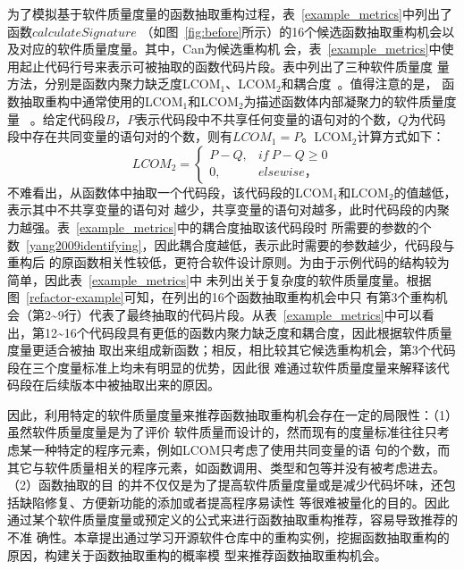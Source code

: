 为了模拟基于软件质量度量的函数抽取重构过程，表~\ref{example_metrics}中列出了函数$calculateSignature$
（如图~\ref{fig:before}所示）的16个候选函数抽取重构机会以及对应的软件质量度量。其中，Can为候选重构机
会，表~\ref{example_metrics}中使用起止代码行号来表示可被抽取的函数代码片段。表中列出了三种软件质量度
量方法，分别是函数内聚力缺乏度LCOM$_1$、LCOM$_2$和耦合度~\cite{yang2009identifying}。值得注意的是，
函数抽取重构中通常使用的LCOM$_1$和LCOM$_2$为描述函数体内部凝聚力的软件质量度量
~\cite{charalampidou2015size}。给定代码段$B$，$P$表示代码段中不共享任何变量的语句对的个数，$Q$为代码
段中存在共同变量的语句对的个数，则有$LCOM_1=P$。LCOM$_2$计算方式如下：
\begin{equation}\label{eq:lcom2}
      LCOM_2 = 
       \begin{cases}
             P-Q, & \textit{if}~P-Q\geq 0\\ 
  0, & elsewise，  
       \end{cases}
\end{equation}
不难看出，从函数体中抽取一个代码段，该代码段的LCOM$_1$和LCOM$_2$的值越低，表示其中不共享变量的语句对
越少，共享变量的语句对越多，此时代码段的内聚力越强。表~\ref{example_metrics}中的耦合度抽取该代码段时
所需要的参数的个数~\ref{yang2009identifying}，因此耦合度越低，表示此时需要的参数越少，代码段与重构后
的原函数相关性较低，更符合软件设计原则。为由于示例代码的结构较为简单，因此表~\ref{example_metrics}中
未列出关于复杂度的软件质量度量。根据图~\ref{refactor-example}可知，在列出的16个函数抽取重构机会中只
有第3个重构机会（第2\textasciitilde9行）代表了最终抽取的代码片段。从表~\ref{example_metrics}中可以看
出，第12\textasciitilde16个代码段具有更低的函数内聚力缺乏度和耦合度，因此根据软件质量度量更适合被抽
取出来组成新函数；相反，相比较其它候选重构机会，第3个代码段在三个度量标准上均未有明显的优势，因此很
难通过软件质量度量来解释该代码段在后续版本中被抽取出来的原因。

因此，利用特定的软件质量度量来推荐函数抽取重构机会存在一定的局限性：（1）虽然软件质量度量是为了评价
软件质量而设计的，然而现有的度量标准往往只考虑某一种特定的程序元素，例如LCOM只考虑了使用共同变量的语
句的个数，而其它与软件质量相关的程序元素，如函数调用、类型和包等并没有被考虑进去。（2）函数抽取的目
的并不仅仅是为了提高软件质量度量或是减少代码坏味，还包括缺陷修复、方便新功能的添加或者提高程序易读性
等很难被量化的目的。因此通过某个软件质量度量或预定义的公式来进行函数抽取重构推荐，容易导致推荐的不准
确性。本章提出通过学习开源软件仓库中的重构实例，挖掘函数抽取重构的原因，构建关于函数抽取重构的概率模
型来推荐函数抽取重构机会。

